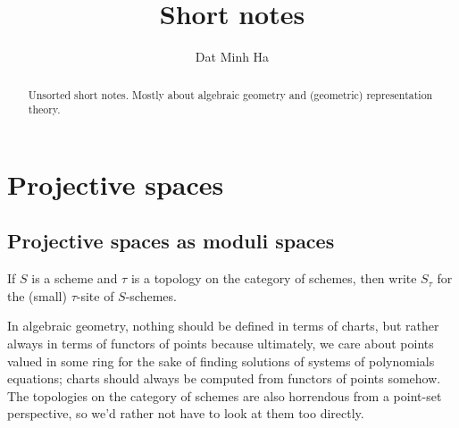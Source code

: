 

\setcounter{section}{0}





    \title{Short notes}
    
    \author{Dat Minh Ha}
    \maketitle
    
    \begin{abstract}
        Unsorted short notes. Mostly about algebraic geometry and (geometric) representation theory.
    \end{abstract}
    
    {
      \hypersetup{} 
      \tableofcontents %
    }

    \listoftodos

    \section{Projective spaces}
        \subsection{Projective spaces as moduli spaces}
            \begin{convention}
                If $S$ is a scheme and $\tau$ is a topology on the category of schemes, then write $S_{\tau}$ for the (small) $\tau$-site of $S$-schemes.
            \end{convention}
        
            In algebraic geometry, nothing should be defined in terms of charts, but rather always in terms of functors of points because ultimately, we care about points valued in some ring for the sake of finding solutions of systems of polynomials equations; charts should always be computed from functors of points somehow. The topologies on the category of schemes are also horrendous from a point-set perspective, so we'd rather not have to look at them too directly.
            
